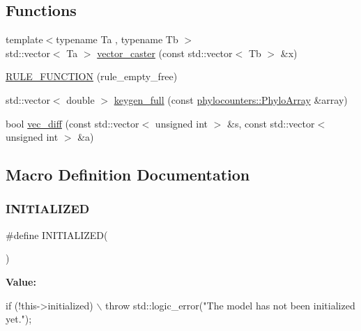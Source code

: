 \subsection*{Functions}
\begin{DoxyCompactItemize}
\item 
{\footnotesize template$<$typename Ta , typename Tb $>$ }\\std\+::vector$<$ Ta $>$ \hyperlink{geese-bones_8hpp_a13c91ee42db6c3b986acbbac4ee58cb0}{vector\+\_\+caster} (const std\+::vector$<$ Tb $>$ \&x)
\item 
\hyperlink{geese-bones_8hpp_a11c7dd7dca27f32547bb602f30ceb5e8}{R\+U\+L\+E\+\_\+\+F\+U\+N\+C\+T\+I\+ON} (rule\+\_\+empty\+\_\+free)
\item 
std\+::vector$<$ double $>$ \hyperlink{geese-bones_8hpp_aa60134cca317d64e4b3d1707380d5d0d}{keygen\+\_\+full} (const \hyperlink{namespacebarry_1_1counters_1_1phylo_abd293bf65e494e903639fb5fb2c91604}{phylocounters\+::\+Phylo\+Array} \&array)
\item 
bool \hyperlink{geese-bones_8hpp_ac4e3e3e3920b3bbde57ac1ed395e9983}{vec\+\_\+diff} (const std\+::vector$<$ unsigned int $>$ \&s, const std\+::vector$<$ unsigned int $>$ \&a)
\end{DoxyCompactItemize}


\subsection{Macro Definition Documentation}
\mbox{\label{geese-bones_8hpp_a08888c91f4cab1da64c8f8bf10b59c40}} 
\subsubsection{\texorpdfstring{I\+N\+I\+T\+I\+A\+L\+I\+Z\+ED}{INITIALIZED}}
{\footnotesize\ttfamily \#define I\+N\+I\+T\+I\+A\+L\+I\+Z\+ED(\begin{DoxyParamCaption}{ }\end{DoxyParamCaption})}

{\bfseries Value\+:}
\begin{DoxyCode}
\textcolor{keywordflow}{if} (!this->initialized) \(\backslash\)
    throw std::logic\_error(\textcolor{stringliteral}{"The model has not been initialized yet."});
\end{DoxyCode}


